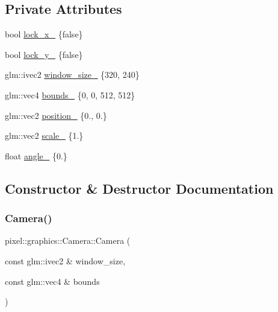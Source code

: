 \subsection*{Private Attributes}
\begin{DoxyCompactItemize}
\item 
bool \hyperlink{classpixel_1_1graphics_1_1_camera_a9b7bbd403181881babd5eaff9f0bdd6e}{lock\+\_\+x\+\_\+} \{false\}
\item 
bool \hyperlink{classpixel_1_1graphics_1_1_camera_adfc7825338faf4222135428fee8aa4cd}{lock\+\_\+y\+\_\+} \{false\}
\item 
glm\+::ivec2 \hyperlink{classpixel_1_1graphics_1_1_camera_a1273eb22b376c868e91c9ed57ffc876f}{window\+\_\+size\+\_\+} \{320, 240\}
\item 
glm\+::vec4 \hyperlink{classpixel_1_1graphics_1_1_camera_a096d3316f5e63f939bce6dce6a115e4d}{bounds\+\_\+} \{0, 0, 512, 512\}
\item 
glm\+::vec2 \hyperlink{classpixel_1_1graphics_1_1_camera_a537a41e4f54c46e28490605f45cfc788}{position\+\_\+} \{0., 0.\}
\item 
glm\+::vec2 \hyperlink{classpixel_1_1graphics_1_1_camera_aec7c23c63fe67de6d66f3fc9622593e9}{scale\+\_\+} \{1.\}
\item 
float \hyperlink{classpixel_1_1graphics_1_1_camera_afbb53e570f87ead316ff290f71570ae0}{angle\+\_\+} \{0.\}
\end{DoxyCompactItemize}


\subsection{Constructor \& Destructor Documentation}
\mbox{\label{classpixel_1_1graphics_1_1_camera_ab919425fc4978e0846a19a9ff446b621}} 
\subsubsection{\texorpdfstring{Camera()}{Camera()}\hspace{0.1cm}{\footnotesize\ttfamily [1/2]}}
{\footnotesize\ttfamily pixel\+::graphics\+::\+Camera\+::\+Camera (\begin{DoxyParamCaption}\item[{const glm\+::ivec2 \&}]{window\+\_\+size,  }\item[{const glm\+::vec4 \&}]{bounds }\end{DoxyParamCaption})}

